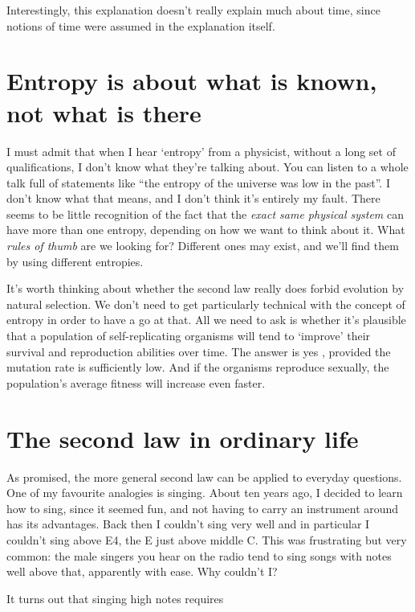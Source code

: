 \documentclass[a4paper, 12pt]{article}
\begin{document}
Interestingly, this explanation doesn't really explain much about time,
since notions of time were assumed in the explanation itself.



\section*{Entropy is about what is known, not what is there}


I must admit that when I hear `entropy' from a physicist, without a long
set of qualifications, I don't know what they're talking about. You can listen
to a whole talk full of statements like ``the entropy of the universe was
low in the past''. I don't know what that means,
and I don't think it's entirely my fault.
There seems to be little recognition of the fact
that the {\em exact same physical system}
can have more than one entropy, depending on how we want to think about it.
What {\em rules of thumb} are we looking for? Different ones may exist, and
we'll find them by using different entropies.

It's worth thinking about whether the second law really does forbid evolution
by natural selection. We don't need to get particularly technical with the
concept of entropy in order to have a go at that. All we need to ask is whether
it's plausible that a population of self-replicating organisms will tend to
`improve' their survival and reproduction abilities over time.
The answer is yes \citep{mackay}, provided the mutation rate is sufficiently
low. And if the organisms reproduce sexually, the population's average fitness
will increase even faster.

\section*{The second law in ordinary life}
As promised, the more general second law can be applied to everyday questions.
One of my favourite analogies is singing. About ten years ago, I decided to
learn how to sing, since it seemed fun, and not having to carry an instrument
around has its advantages. Back then I couldn't sing very well and in particular
I couldn't sing above E4, the E just above middle C. This was frustrating but
very common: the male singers you hear on the radio tend to sing songs with
notes well above that, apparently with ease. Why couldn't I?

It turns out that singing high notes requires 
\end{document}

